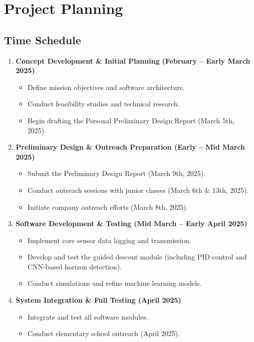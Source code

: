 \documentclass{article}
\begin{document}
\section{Project Planning}

\subsection{Time Schedule}
\begin{enumerate}
    \item \textbf{Concept Development \& Initial Planning (February – Early March 2025)}
    \begin{itemize}
        \item Define mission objectives and software architecture.
        \item Conduct feasibility studies and technical research.
        \item Begin drafting the Personal Preliminary Design Report (March 5th, 2025).
    \end{itemize}
    \item \textbf{Preliminary Design \& Outreach Preparation (Early – Mid March 2025)}
    \begin{itemize}
        \item Submit the Preliminary Design Report (March 9th, 2025).
        \item Conduct outreach sessions with junior classes (March 6th \& 13th, 2025).
        \item Initiate company outreach efforts (March 8th, 2025).
    \end{itemize}
    \item \textbf{Software Development \& Testing (Mid March – Early April 2025)}
    \begin{itemize}
        \item Implement core sensor data logging and transmission.
        \item Develop and test the guided descent module (including PID control and CNN-based horizon detection).
        \item Conduct simulations and refine machine learning models.
    \end{itemize}
    \item \textbf{System Integration \& Full Testing (April 2025)}
    \begin{itemize}
        \item Integrate and test all software modules.
        \item Conduct elementary school outreach (April 2025).

\end{itemize}
\end{enumerate}
\end{document}
